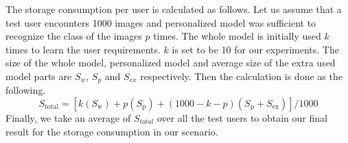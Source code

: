 The storage consumption per user is calculated as follows. 
Let us assume that a test user encounters 1000 images and personalized model was sufficient to recognize the class of the images $p$ times. 
The whole model is initially used $k$ times to learn the user requirements. 
$k$ is set to be 10 for our experiments.
The size of the whole model, personalized model and average size of the extra used model parts are $S_w$, $S_p$ and $S_{ex}$ respectively.
Then the calculation is done as the following.
\begin{equation}
    S_\mathrm{total} = [k(S_\mathrm{w}) + p(S_\mathrm{p}) + (1000-k-p)(S_\mathrm{p}+S_\mathrm{ex})] / 1000
\end{equation}
Finally, we take an average of $S_{total}$ over all the test users to obtain our final result for the storage consumption in our scenario.


